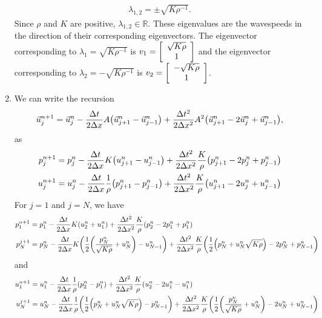 \documentclass{article} %
\theoremstyle{plain}
\newcommand{\Dx}{\Delta x}
\newcommand{\Dt}{\Delta t}
\numberwithin{equation}{section} %
\numberwithin{figure}{section} %
\numberwithin{table}{section} %
\begin{document}
\begin{enumerate}[\ \ (a)]
        \begin{align*}
            \lambda_{1,2} = \pm\sqrt{K\rho^{-1}}.
        \end{align*}
        Since $\rho$ and $K$ are positive, $\lambda_{1,2} \in \mathbb{R}$.  These eigenvalues are the wavespeeds in the direction of their corresponding eigenvectors.  The eigenvector corresponding to $\lambda_1 = \sqrt{K\rho^{-1}}$ is $v_1 = \qty[\begin{array}{c}\sqrt{K\rho} \\ 1\end{array}]$ and the eigenvector corresponding to $\lambda_2 = -\sqrt{K\rho^{-1}}$ is $v_2 = \qty[\begin{array}{c}-\sqrt{K\rho} \\ 1\end{array}]$.
    \item
        We can write the recursion $$\vec{u}_j^{n+1} = \vec{u}_j^n - \frac{\Dt}{2\Dx}A\qty(\vec{u}_{j+1}^n - \vec{u}_{j-1}^n) + \frac{\Dt^2}{2\Dx^2}A^2\qty(\vec{u}_{j+1}^n - 2\vec{u}_j^n + \vec{u}_{j-1}^n),$$ as
        \begin{align*}
            p_j^{n+1} &= p_j^n - \frac{\Dt}{2\Dx}K\qty(u_{j+1}^n - u_{j-1}^n) + \frac{\Dt^2}{2\Dx^2}\frac{K}{\rho}\qty(p_{j+1}^n-2p_j^n+p_{j-1}^n) \\
            u_j^{n+1} &= u_j^n - \frac{\Dt}{2\Dx}\frac{1}{\rho}\qty(p_{j+1}^n - p_{j-1}^n) + \frac{\Dt^2}{2\Dx^2}\frac{K}{\rho}\qty(u_{j+1}^n-2u_j^n+u_{j-1}^n)
        \end{align*}
        For $j = 1$ and $j = N$, we have
        \begin{align*}
            p_1^{n+1} &= p_1^n - \frac{\Dt}{2\Dx}K\qty(u_2^n + u_1^n) + \frac{\Dt^2}{2\Dx^2}\frac{K}{\rho}\qty(p_2^n - 2p_1^n + p_1^n) \\
            p_N^{j+1} &= p_N^n - \frac{\Dt}{2\Dx}K\qty(\frac{1}{2}\qty(\frac{p_N^n}{\sqrt{K\rho}} + u_N^n) - u_{N-1}^n) + \frac{\Dt^2}{2\Dx^2}\frac{K}{\rho}\qty(\frac{1}{2}\qty(p_N^n + u_N^n\sqrt{K\rho}) - 2p_N^n + p_{N-1}^n)
        \end{align*}
        and
        \begin{align*}
            u_1^{n+1} &= u_1^n - \frac{\Dt}{2\Dx}\frac{1}{\rho}\qty(p_2^n - p_1^n) + \frac{\Dt^2}{2\Dx^2}\frac{K}{\rho}\qty(u_2^n - 2u_1^n - u_1^n) \\
            u_N^{j+1} &= u_N^n - \frac{\Dt}{2\Dx}\frac{1}{\rho}\qty(\frac{1}{2}\qty(p_N^n + u_N^n\sqrt{K\rho}) - p_{N-1}^n) + \frac{\Dt^2}{2\Dx^2}\frac{K}{\rho}\qty(\frac{1}{2}\qty(\frac{p_N^n}{\sqrt{K\rho}} + u_N^n) - 2u_N^n + u_{N-1}^n)

\end{align*}
\end{enumerate}
\end{document}
